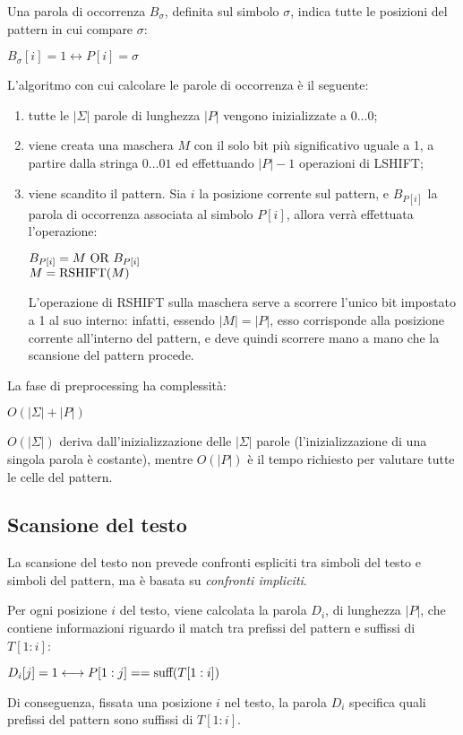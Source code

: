 Una parola di occorrenza $B_{\sigma}$, definita sul simbolo $\sigma$, indica tutte le posizioni del pattern in cui compare $\sigma$:
\begin{center}
    $B_{\sigma}[i] = 1 \longleftrightarrow P[i] = \sigma$
\end{center}
L'algoritmo con cui calcolare le parole di occorrenza è il seguente:
\begin{enumerate}
    \item tutte le $|\Sigma|$ parole di lunghezza $|P|$ vengono inizializzate a $0\ldots0$;
    \item viene creata una maschera $M$ con il solo bit più significativo uguale a 1, a partire dalla stringa $0\ldots01$ ed effettuando $|P| - 1$ operazioni di LSHIFT;
    \item viene scandito il pattern.
    Sia $i$ la posizione corrente sul pattern, e $B_{P[i]}$ la parola di occorrenza associata al simbolo $P[i]$, allora verrà effettuata l'operazione:
    \begin{center}
        $B_{P[i]} = M \textnormal{ OR } B_{P[i]}$\\
        $M = \textnormal{RSHIFT}(M)$
    \end{center}
    L'operazione di RSHIFT sulla maschera serve a scorrere l'unico bit impostato a 1 al suo interno: infatti, essendo $|M| = |P|$, esso corrisponde alla posizione corrente all'interno del pattern, e deve quindi scorrere mano a mano che la scansione del pattern procede.
\end{enumerate}
La fase di preprocessing ha complessità:
\begin{center}
    $O(|\Sigma| + |P|)$
\end{center}
$O(|\Sigma|)$ deriva dall'inizializzazione delle $|\Sigma|$ parole (l'inizializzazione di una singola parola è costante), mentre $O(|P|)$ è il tempo richiesto per valutare tutte le celle del pattern.

\subsection{Scansione del testo}
La scansione del testo non prevede confronti espliciti tra simboli del testo e simboli del pattern, ma è basata su \textit{confronti impliciti}.

Per ogni posizione $i$ del testo, viene calcolata la parola $D_i$, di lunghezza $|P|$, che contiene informazioni riguardo 
il match tra prefissi del pattern e suffissi di $T[1:i]$:
\begin{center}
    $D_i[j] = 1 \longleftrightarrow P[1:j] == \textnormal{suff}(T[1:i])$
\end{center}
Di conseguenza, fissata una posizione $i$ nel testo, la parola $D_i$ specifica quali prefissi del pattern sono suffissi di $T[1:i]$.


